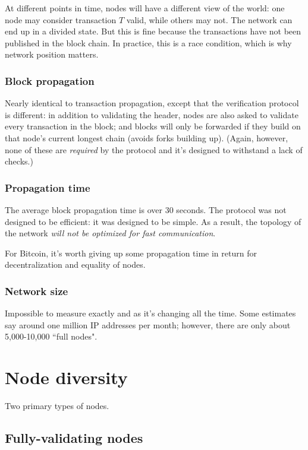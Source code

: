 \documentclass[12pt]{article}
\begin{document}
At different points in time, nodes will have a different view of the world: one node may consider transaction $T$ valid, while others may not. The network can end up in a divided state. But this is fine because the transactions have not been published in the block chain. In practice, this is a race condition, which is why network position matters.

\subsubsection*{Block propagation}

Nearly identical to transaction propagation, except that the verification protocol is different: in addition to validating the header, nodes are also asked to validate every transaction in the block; and blocks will only be forwarded if they build on that node's current longest chain (avoids forks building up). (Again, however, none of these are \textit{required} by the protocol and it's designed to withstand a lack of checks.)

\subsubsection*{Propagation time}

The average block propagation time is over 30 seconds. The protocol was not designed to be efficient: it was designed to be simple. As a result, the topology of the network \textit{will not be optimized for fast communication}.

For Bitcoin, it's worth giving up some propagation time in return for decentralization and equality of nodes.

\subsubsection*{Network size}

Impossible to measure exactly and as it's changing all the time. Some estimates say around one million IP addresses per month; however, there are only about 5,000-10,000 ``full nodes".

\section*{Node diversity}

Two primary types of nodes.

\subsection*{Fully-validating nodes}
\end{document}

